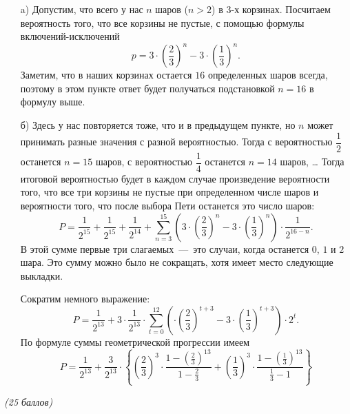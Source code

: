 \solutionSection

\begin{enumerate}

    \item[a)]  Допустим, что всего у нас $n$ шаров ($n > 2$) в $3$-х корзинах. Посчитаем вероятность того, что все корзины не пустые, 
	с помощью формулы включений-исключений
	$$p = 3 \cdot \left(\frac{2}{3}\right)^{n} - 3 \cdot \left(\frac{1}{3}\right)^{n}.$$
	Заметим, что в наших корзинах остается $16$ определенных шаров
	всегда, поэтому в этом пункте ответ будет получаться подстановкой
	$n = 16$ в формулу выше. 

	\item[б)] Здесь у нас повторяется тоже, что и в предыдущем пункте,
	но $n$ может принимать разные значения с разной вероятностью.
	Тогда с вероятностью $\dfrac{1}{2}$ останется $n = 15$ шаров,
	с вероятностью $\dfrac{1}{4}$ останется $n = 14$ шаров, \ldots
	Тогда итоговой вероятностью будет в каждом случае произведение
	вероятности того, что все три корзины не пустые при определенном
	числе шаров и вероятности того, что после выбора Пети останется
	это число шаров:
	$$P = \frac{1}{2^{15}} + \frac{1}{2^{15}} + \frac{1}{2^{14}} + 
	\sum\limits_{n=3}^{15} \left(3 \cdot \left(\frac{2}{3}\right)^{n} - 3 \cdot \left(\frac{1}{3}\right)^{n}\right) \cdot \frac{1}{2^{16-n}}.$$
	В этой сумме первые три слагаемых~---~это случаи, когда останется
	$0$, $1$ и $2$ шара. Это сумму можно было не сокращать, хотя имеет
	место следующие выкладки.
	
	Сократим немного выражение:
	$$P = \frac{1}{2^{13}} + 3 \cdot \frac{1}{2^{13}}
	\cdot \sum\limits_{t = 0}^{12}
	\left(\cdot \left(\frac{2}{3}\right)^{t+3} - 3 \cdot \left(\frac{1}{3}\right)^{t+3}\right) \cdot 2^{t}.$$
	По формуле суммы геометрической прогрессии имеем
	$$P = \frac{1}{2^{13}} + \frac{3}{2^{13}} \cdot\left\{ \left(\frac{2}{3}\right)^3 
	\cdot \frac{1 - \left(\frac{2}{3}\right)^{13}}{1 - \frac{2}{3}} + 
    \left(\frac{1}{3}\right)^3 \cdot \frac{1 - \left(\frac{1}{3}\right)^{13}}{\frac{1}{3} - 1}\right\}$$
    
\end{enumerate}	


\additionalCriteria

\textit{(25 баллов)}

